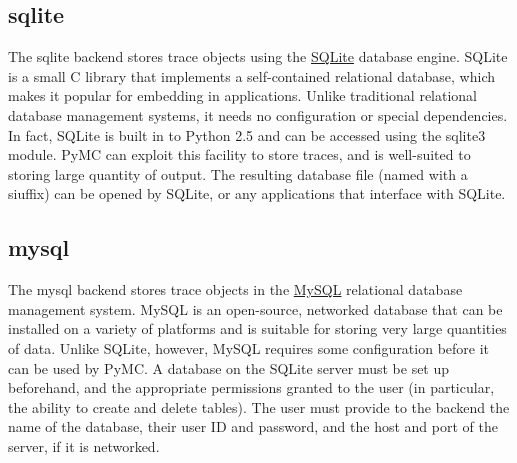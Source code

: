 \hypertarget{sqlite}{}
\subsection*{sqlite}
\label{sqlite}

The sqlite backend stores trace objects using the \href{http://www.sqlite.org/}{SQLite} database engine. SQLite is a small C library that implements a self-contained relational database, which makes it popular for embedding in applications. Unlike traditional relational database management systems, it needs no configuration or special dependencies. In fact, SQLite is built in to Python 2.5 and can be accessed using the sqlite3 module. PyMC can exploit this facility to store traces, and is well-suited to storing large quantity of output. The resulting database file (named with a  siuffix) can be opened by SQLite, or any applications that interface with SQLite.



\hypertarget{mysql}{}
\subsection*{mysql}
\label{mysql}

The mysql backend stores trace objects in the \href{http://www.mysql.com/}{MySQL} relational database management system. MySQL is an open-source, networked database that can be installed on a variety of platforms and is suitable for storing very large quantities of data. Unlike SQLite, however, MySQL requires some configuration before it can be used by PyMC. A database on the SQLite server must be set up beforehand, and the appropriate permissions granted to the user (in particular, the ability to create and delete tables). The user must provide to the backend the name of the database, their user ID and password, and the host and port of the server, if it is networked.

